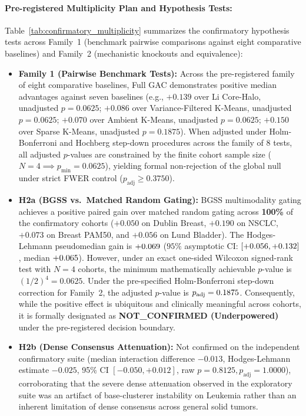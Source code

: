 \documentclass[pdflatex,sn-mathphys-num]{sn-jnl}
\theoremstyle{thmstyleone}
\theoremstyle{thmstyletwo}
\theoremstyle{thmstylethree}
\begin{document}
\paragraph{Pre-registered Multiplicity Plan and Hypothesis Tests:}
Table~\ref{tab:confirmatory_multiplicity} summarizes the confirmatory hypothesis tests across Family~1 (benchmark pairwise comparisons against eight comparative baselines) and Family~2 (mechanistic knockouts and equivalence):
\begin{itemize}
    \item \textbf{Family 1 (Pairwise Benchmark Tests):} Across the pre-registered family of eight comparative baselines, Full GAC demonstrates positive median advantages against seven baselines (e.g., $+0.139$ over Li Core-Halo, unadjusted $p = 0.0625$; $+0.086$ over Variance-Filtered K-Means, unadjusted $p = 0.0625$; $+0.070$ over Ambient K-Means, unadjusted $p = 0.0625$; $+0.150$ over Sparse K-Means, unadjusted $p = 0.1875$). When adjusted under Holm-Bonferroni and Hochberg step-down procedures across the family of 8 tests, all adjusted $p$-values are constrained by the finite cohort sample size ($N=4 \implies p_{\min} = 0.0625$), yielding formal non-rejection of the global null under strict FWER control ($p_{\text{adj}} \ge 0.3750$).
    \item \textbf{H2a (BGSS vs.\ Matched Random Gating):} BGSS multimodality gating achieves a positive paired gain over matched random gating across \textbf{100\%} of the confirmatory cohorts ($+0.050$ on Dublin Breast, $+0.190$ on NSCLC, $+0.073$ on Breast PAM50, and $+0.056$ on Lund Bladder). The Hodges-Lehmann pseudomedian gain is $+0.069$ ($95\%$ asymptotic CI: $[+0.056, +0.132]$, median $+0.065$). However, under an exact one-sided Wilcoxon signed-rank test with $N=4$ cohorts, the minimum mathematically achievable $p$-value is $(1/2)^4 = 0.0625$. Under the pre-specified Holm-Bonferroni step-down correction for Family~2, the adjusted $p$-value is $p_{\text{adj}} = 0.1875$. Consequently, while the positive effect is ubiquitous and clinically meaningful across cohorts, it is formally designated as \textbf{NOT\_CONFIRMED (Underpowered)} under the pre-registered decision boundary.
    \item \textbf{H2b (Dense Consensus Attenuation):} Not confirmed on the independent confirmatory suite (median interaction difference $-0.013$, Hodges-Lehmann estimate $-0.025$, 95\% CI $[-0.050, +0.012]$, raw $p = 0.8125, p_{\text{adj}} = 1.0000$), corroborating that the severe dense attenuation observed in the exploratory suite was an artifact of base-clusterer instability on Leukemia rather than an inherent limitation of dense consensus across general solid tumors.

\end{itemize}
\end{document}
